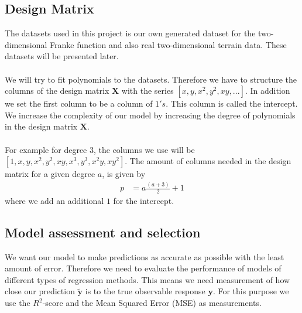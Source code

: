\documentclass[a4paper,twocolumn]{article}
\newcommand{\y}{\mathbf{y}}
\newcommand{\ytilde}{\mathbf{\widetilde{y}}}
\newcommand{\X}{\mathbf{X}}
\begin{document}
\subsection{Design Matrix}
The datasets used in this project is our own generated dataset for the two-dimensional Franke function and also real two-dimensional terrain data. These datasets will be presented later. \\
\\
We will try to fit polynomials to the datasets. Therefore we have to structure the columns of the design matrix $\X$ with the series $[x, y, x^{2}, y^{2}, xy, ...]$. In addition we set the first column to be a column of $1's$. This column is called the intercept. We increase the complexity of our model by increasing the degree of polynomials in the design matrix $\X$.\\
\\
For example for degree 3, the columns we use will be $[1, x, y, x^{2}, y^{2}, xy, x^{3}, y^{3}, x^{2}y, xy^{2}]$. The amount of columns needed in the design matrix for a given degree $a$, is given by
\begin{align*}
    p &= a\frac{(a+3)}{2} + 1
\end{align*}
where we add an additional $1$ for the intercept.
\subsection{Model assessment and selection}
We want our model to make predictions as accurate as possible with the least amount of error. Therefore we need to evaluate the performance of models of different types of regression methods. This means we need measurement of how close our prediction $\ytilde$ is to the true observable response $\y$. For this purpose we use the $R^{2}$-score and the Mean Squared Error (MSE) as measurements.
\end{document}
